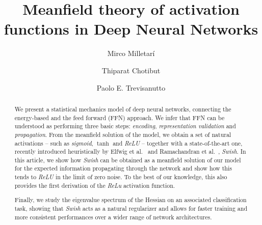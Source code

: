 \documentclass[5p]{elsarticle}
\begin{document}
\begin{frontmatter}

\title{Meanfield theory of activation functions in Deep Neural Networks}

 \author[mirco]{Mirco Milletar\'i }

 \author[thip]{Thiparat Chotibut }

 \author[paolo]{Paolo E. Trevisanutto}



\address[mirco]{Microsoft, Singapore}
\address[thip]{Singapore University of Technology and Design, Singapore.}
\address[paolo]{Graphene Research Centre and CA2DM, National University of Singapore, Singapore. }


\begin{abstract}
We present a statistical mechanics model of deep neural networks, connecting the energy-based and the feed forward (FFN) approach.
We infer that FFN can be understood as performing three basic steps: {\it encoding}, { \it representation validation} and {\it propagation}. From the meanfield solution of the model, we obtain a set of natural activations -- such as {\it sigmoid}, $\tanh$ and {\it ReLU} -- together with a state-of-the-art one, recently introduced heuristically by Elfwig et al.~\cite{elfwig} and Ramachandran et al.~\cite{prajit}, \textit{Swish}. In this article, we show how \textit{Swish} can be obtained as a meanfield solution of our model for the expected information propagating through the network and show how this tends to \textit{ReLU} in the limit of zero noise. To the best of our knowledge, this also provides the first derivation of the \textit{ReLu} activation function.

Finally, we study the eigenvalue spectrum of the Hessian on an associated classification task, showing that \textit{Swish} acts as a natural regularizer and allows for faster training and more consistent performances over a wider range of network architectures.

\end{abstract}

\begin{keyword}

\end{keyword}

\end{frontmatter}
\end{document}
